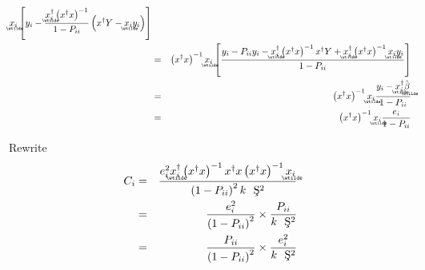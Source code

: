 \documentclass{article}
\begin{document}
\begin{eqnarray*}
\underaccent{\wtilde}{x}%
_{i}\left[ y_{i}-\frac{%
\underaccent{\wtilde}{x}%
_{i}^{\dagger }\left( x^{\dagger }x\right) ^{-1}}{1-P_{ii}}\left( x^{\dagger
}Y-%
\underaccent{\wtilde}{x}%
_{i}y_{i}\right) \right] \\
&=&\left( x^{\dagger }x\right) ^{-1}%
\underaccent{\wtilde}{x}%
_{i}\left[ \frac{y_{i}-P_{ii}y_{i}-%
\underaccent{\wtilde}{x}%
_{i}^{\dagger }\left( x^{\dagger }x\right) ^{-1}x^{\dagger }Y+%
\underaccent{\wtilde}{x}%
_{i}^{\dagger }\left( x^{\dagger }x\right) ^{-1}%
\underaccent{\wtilde}{x}%
_{i}y_{i}}{1-P_{ii}}\right] \\
&=&\left( x^{\dagger }x\right) ^{-1}%
\underaccent{\wtilde}{x}%
_{i}\frac{y_{i}-%
\underaccent{\wtilde}{x}%
_{i}^{\dagger }%
\underaccent{\wtilde}{\hat{\beta}}%
}{1-P_{ii}} \\
&=&\left( x^{\dagger }x\right) ^{-1}%
\underaccent{\wtilde}{x}%
_{i}\frac{e_{i}}{1-P_{ii}}
\end{eqnarray*}

\bigskip

Rewrite%
\begin{eqnarray*}
C_{i} &=&\frac{e_{i}^{2}%
\underaccent{\wtilde}{x}%
_{i}^{\dagger }\left( x^{\dagger }x\right) ^{-1}x^{\dagger }x\left(
x^{\dagger }x\right) ^{-1}%
\underaccent{\wtilde}{x}%
_{i}}{\left( 1-P_{ii}\right) ^{2}k\text{\c{S}}^{2}} \\
&=&\frac{e_{i}^{2}}{\left( 1-P_{ii}\right) ^{2}}\times \frac{P_{ii}}{k\text{%
\c{S}}^{2}} \\
&=&\frac{P_{ii}}{\left( 1-P_{ii}\right) ^{2}}\times \frac{e_{i}^{2}}{k\text{%
\c{S}}^{2}}
\end{eqnarray*}
\end{document}
